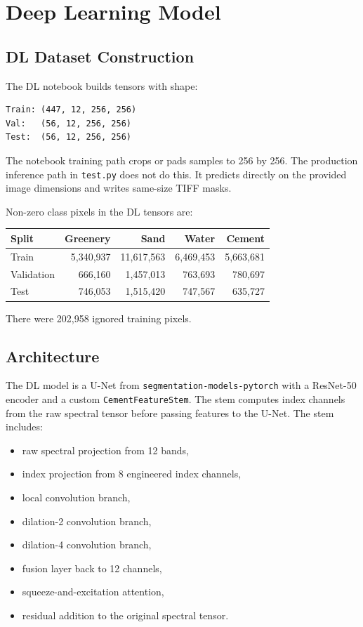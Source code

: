 \documentclass[11pt,a4paper]{article}
\begin{document}
\section{Deep Learning Model}

\subsection{DL Dataset Construction}

The DL notebook builds tensors with shape:
\begin{verbatim}
Train: (447, 12, 256, 256)
Val:   (56, 12, 256, 256)
Test:  (56, 12, 256, 256)
\end{verbatim}

The notebook training path crops or pads samples to 256 by 256. The production inference path in \texttt{test.py} does not do this. It predicts directly on the provided image dimensions and writes same-size TIFF masks.

Non-zero class pixels in the DL tensors are:
\begin{center}
\begin{tabular}{lrrrr}
\toprule
Split & Greenery & Sand & Water & Cement \\
\midrule
Train & 5,340,937 & 11,617,563 & 6,469,453 & 5,663,681 \\
Validation & 666,160 & 1,457,013 & 763,693 & 780,697 \\
Test & 746,053 & 1,515,420 & 747,567 & 635,727 \\
\bottomrule
\end{tabular}
\end{center}

There were 202,958 ignored training pixels.

\subsection{Architecture}

The DL model is a U-Net from \texttt{segmentation-models-pytorch} with a ResNet-50 encoder and a custom \texttt{CementFeatureStem}. The stem computes index channels from the raw spectral tensor before passing features to the U-Net. The stem includes:
\begin{itemize}[noitemsep]
  \item raw spectral projection from 12 bands,
  \item index projection from 8 engineered index channels,
  \item local convolution branch,
  \item dilation-2 convolution branch,
  \item dilation-4 convolution branch,
  \item fusion layer back to 12 channels,
  \item squeeze-and-excitation attention,
  \item residual addition to the original spectral tensor.
\end{itemize}
\end{document}
